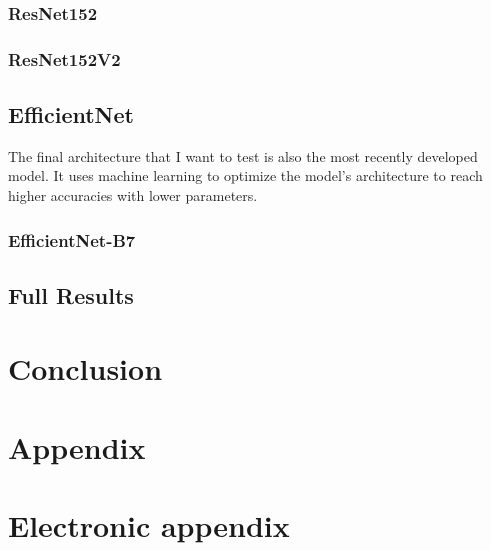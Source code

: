\documentclass[12pt]{article}
\numberwithin{equation}{subsection}
\begin{document}
\subsubsection{ResNet152}


\subsubsection{ResNet152V2}


\subsection{EfficientNet}
The final architecture that I want to test is also the most recently developed model. It uses machine learning to optimize the model's architecture to reach higher accuracies with lower parameters.

\subsubsection{EfficientNet-B7}


\newpage
\subsection{Full Results}
\label{Results}



\newpage
\section{Conclusion}
\label{conclusion}

\newpage

    

\setcounter{page}{1} %

\appendix

\section{Appendix}
\label{app}

\newpage

\section{Electronic appendix}
\label{el_app}
\end{document}
